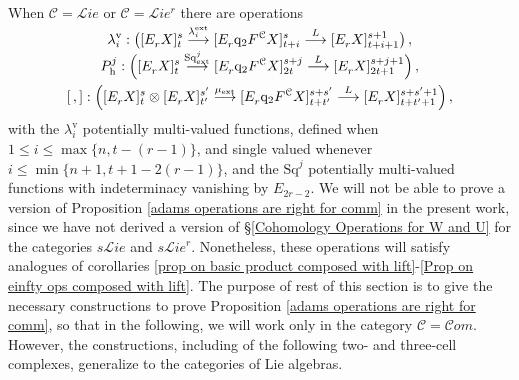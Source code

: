 \documentclass[11pt]{amsart} \renewcommand{\baselinestretch}{1.2}
\theoremstyle{plain}
\theoremstyle{definition}
\renewcommand{\to}{\longrightarrow}
\newcommand{\scrL}{\mathscr{L}}
\newcommand{\scrC}{\mathscr{C}}
\newcommand{\calc}{\mathcal{C}}
\newcommand{\quadgrad}[1]{\mathrm{q}_{#1}}
\newcommand{\Sq}{\mathrm{Sq}}
\newcommand{\algs}{{\scrC\!\textit{om}}}
\newcommand{\liealgs}{{\scrL\!\textit{ie}}}
\newcommand{\restliealgs}{{\scrL\!\textit{ie}^\textit{r}}}
\newcommand{\Edownup}[5]{[E_{#1}^{#2}#3]^{#4}_{#5}}
\newcommand{\uver}{^\mathrm{v}}
\newcommand{\dhor}{_\mathrm{h}}
\newcommand{\lambdav}{\lambda\uver}
\newcommand{\Ph}{P\dhor}
\begin{document}
\begin{Operations on the Bousfield-Kan spectral sequence}
When $\calc=\liealgs$ or $\calc=\restliealgs$ there are operations
\begin{gather*}
\lambdav_i:\left(\Edownup{r}{}{X}{s}{t} \smash{{}\overset{\lambda_i^\textup{ext}}{\to}{}} \Edownup{r}{}{\quadgrad{2}F^\calc X}{s}{t+i}\smash{{}\overset{L}{\to} {}}
\Edownup{r}{}{X}{s+1}{t+i+1}\right),
\\
\Ph^{j}:\left(\Edownup{r}{}{X}{s}{t}   \smash{{}\overset{\Sq^j_\textup{ext}}{\to}{}} \Edownup{r}{}{\quadgrad{2}F^\calc X}{s+j}{2t}\smash{{}\overset{L}{\to} {}}
\Edownup{r}{}{X}{s+j+1}{2t+1}\right),\\
[\,,]:\left(\Edownup{r}{}{X}{s}{t}\otimes \Edownup{r}{}{X}{s'}{t'}\smash{{}\overset{\mu_\textup{ext}}{\to}{}} \Edownup{r}{}{\quadgrad{2}F^\calc X}{s+s'}{t+t'}\smash{{}\overset{L}{\to} {}}
\Edownup{r}{}{X}{s+s'+1}{t+t'+1}\right),
\end{gather*}
with the $\lambdav_i$ potentially multi-valued functions,  defined when $1\leq i\leq \max\{n,t-(r-1)\}$, and single valued whenever $i\leq\min\{n+1,t+1-2(r-1)\}$, and the $\Sq^j$ potentially multi-valued functions with indeterminacy vanishing by $E_{2r-2}$. We will not be able to prove a version of Proposition \ref{adams operations are right for comm} in the present work, since we have not derived a version of \S\ref{Cohomology Operations for W and U} for the categories $s\liealgs$ and $s\restliealgs$. Nonetheless, these operations will satisfy analogues of corollaries \ref{prop on basic product composed with lift}-\ref{Prop on einfty ops composed with lift}. The purpose of rest of this section is to give the necessary constructions to  prove Proposition \ref{adams operations are right for comm}, so that in the following, we will work only in the category $\calc=\algs$. However, the constructions, including of the following two- and three-cell complexes, generalize to the categories of Lie algebras.




\end{Operations on the Bousfield-Kan spectral sequence}
\end{document}
